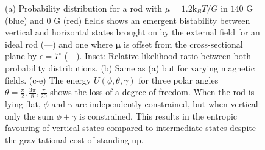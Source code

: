 \documentclass[aps,prl,twocolumn,superscriptaddress]{revtex4-1}
\newcommand{\vc}[1]{\boldsymbol{#1}}
\newcommand{\kk}{\mathrm{k}_B}
\begin{document}
\begin{figure}
    \caption{\footnotesize (a) Probability distribution for a rod with $\mu=1.2 \kk T/G$ in $140$ G (blue) and $0$ G (red) fields shows an emergent bistability between vertical and horizontal states brought on by the external field for an ideal rod (---) and one where $\vc{\mu}$ is offset from the cross-sectional plane by $\epsilon=7^\circ$ (- -). Inset: Relative likelihood ratio between both probability distributions. (b) Same as (a) but for varying magnetic fields. (c-e) The energy $U(\phi,\theta,\gamma)$ for three polar angles $\theta=\frac{\pi}{2},\frac{3\pi}{8},\frac{\pi}{20}$ shows the loss of a degree of freedom. When the rod is lying flat, $\phi$ and $\gamma$ are independently constrained, but when vertical only the sum $\phi+\gamma$ is constrained. This results in the entropic favouring of vertical states compared to intermediate states despite the gravitational cost of standing up. \label{theory}}
\end{figure}
\end{document}
